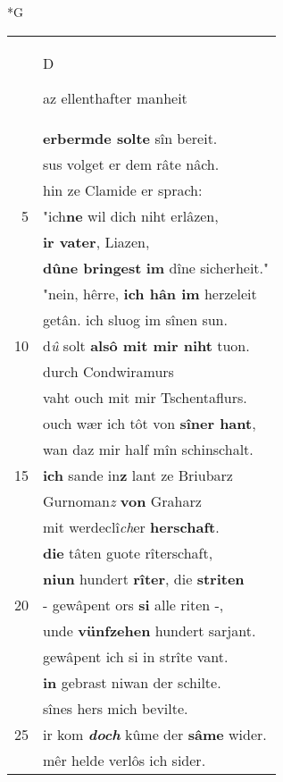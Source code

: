 \documentclass[8pt,a4paper,notitlepage]{article}
\begin{document}
\newpage
\begin{table}[ht]
\begin{minipage}[t]{0.5\linewidth}
\small
\begin{center}*G
\end{center}
\begin{tabular}{rl}
 & \begin{large}D\end{large}az ellenthafter manheit\\ 
 & \textbf{erbermde solte} sîn bereit.\\ 
 & sus volget er dem râte nâch.\\ 
 & hin ze Clamide er sprach:\\ 
5 & "ich\textbf{ne} wil dich niht erlâzen,\\ 
 & \textbf{ir vater}, Liazen,\\ 
 & \textbf{dûne bringest} \textbf{im} dîne sicherheit."\\ 
 & "nein, hêrre, \textbf{ich hân im} herzeleit\\ 
 & getân. ich sluog im sînen sun.\\ 
10 & d\textit{û} solt \textbf{alsô mit mir niht} tuon.\\ 
 & durch Condwiramurs\\ 
 & vaht ouch mit mir Tschentaflurs.\\ 
 & ouch wær ich tôt von \textbf{sîner hant},\\ 
 & wan daz mir half mîn schinschalt.\\ 
15 & \textbf{ich} sande in\textbf{z} lant ze Briubarz\\ 
 & Gurnoman\textit{z} \textbf{von} Graharz\\ 
 & mit werdeclî\textit{ch}er \textbf{herschaft}.\\ 
 & \textbf{die} tâten guote rîterschaft,\\ 
 & \textbf{niun} hundert \textbf{rîter}, die \textbf{striten}\\ 
20 & - gewâpent ors \textbf{si} alle riten -,\\ 
 & unde \textbf{vünfzehen} hundert sarjant.\\ 
 & gewâpent ich si in strîte vant.\\ 
 & \textbf{in} gebrast niwan der schilte.\\ 
 & sînes hers mich bevilte.\\ 
25 & ir kom \textit{\textbf{doch}} kûme der \textbf{sâme} wider.\\ 
 & mêr helde verlôs ich sider.\\ 

\end{tabular}
\end{minipage}
\end{table}
\end{document}
